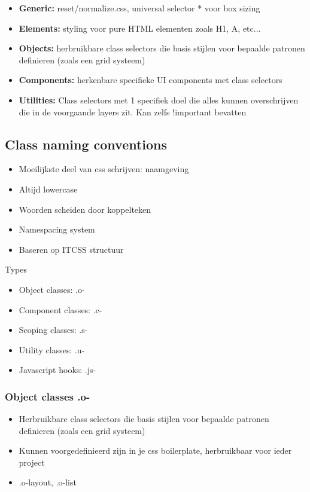 \documentclass{article}
\newcommand{\bold}[1]{\textbf{#1}}
\begin{document}
\begin{itemize}
    \item \bold{Generic:} reset/normalize.css, universal selector * voor box sizing
    \item \bold{Elements:} styling voor pure HTML elementen zoals H1, A, etc...
    \item \bold{Objects:} herbruikbare class selectors die basis stijlen voor bepaalde patronen definieren (zoals een grid systeem)
    \item \bold{Components:} herkenbare specifieke UI components met class selectors 
    \item \bold{Utilities:} Class selectors met 1 specifiek doel die alles kunnen overschrijven die in de voorgaande layers zit. Kan zelfs !important bevatten
\end{itemize}

\subsection{Class naming conventions}
\begin{itemize}
    \item Moeilijkste deel van css schrijven: naamgeving
    \item Altijd lowercase
    \item Woorden scheiden door koppelteken
    \item Namespacing system
    \item Baseren op ITCSS structuur
\end{itemize}

Types

\begin{itemize}
    \item Object classes: .o-
    \item Component classes: .c-
    \item Scoping classes: .s-
    \item Utility classes: .u-
    \item Javascript hooks: .js-
\end{itemize}

\subsubsection{Object classes .o-}
\begin{itemize}
    \item Herbruikbare class selectors die basis stijlen voor bepaalde patronen definieren (zoals een grid systeem)
    \item Kunnen voorgedefinieerd zijn in je css boilerplate, herbruikbaar voor ieder project
    \item .o-layout, .o-list
\end{itemize}
\end{document}
